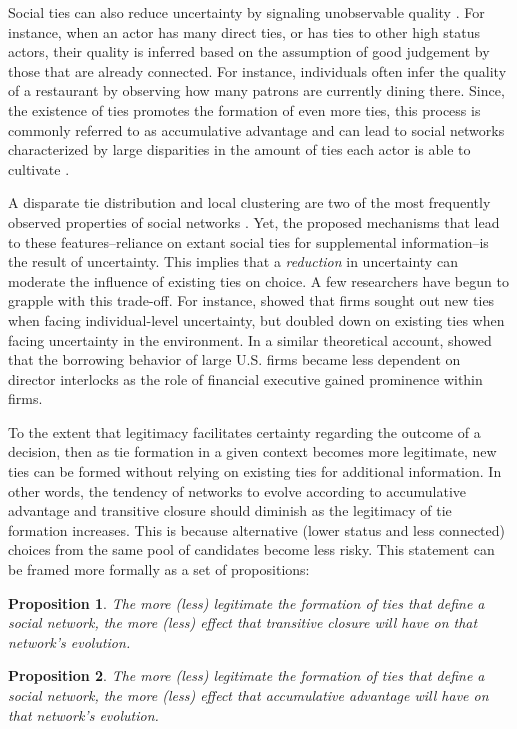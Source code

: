 \documentclass[12pt]{article}
\newtheorem{prop}{Proposition}
\begin{document}
Social ties can also reduce uncertainty by signaling unobservable quality \cite{514}. For instance, when an actor has many direct ties, or has ties to other high status actors, their quality is inferred based on the assumption of good judgement by those that are already connected. For instance, individuals often infer the quality of a restaurant by observing how many patrons are currently dining there. Since, the existence of ties promotes the formation of even more ties, this process is commonly referred to as accumulative advantage and can lead to social networks characterized by large disparities in the amount of ties each actor is able to cultivate \cite{538}. 

A disparate tie distribution and local clustering are two of the most frequently observed properties of social networks \cite{907}. Yet, the proposed mechanisms that lead to these features--reliance on extant social ties for supplemental information--is the result of uncertainty. This implies that a \emph{reduction} in uncertainty can moderate the influence of existing ties on choice. A few researchers have begun to grapple with this trade-off. For instance,  showed that firms sought out new ties when facing individual-level uncertainty, but doubled down on existing ties when facing uncertainty in the environment. In a similar theoretical account,  showed that the borrowing behavior of large U.S. firms became less dependent on director interlocks as the role of financial executive gained prominence within firms. 

To the extent that legitimacy facilitates certainty regarding the outcome of a decision, then as tie formation in a given context becomes more legitimate, new ties can be formed without relying on existing ties for additional information. In other words, the tendency of networks to evolve according to accumulative advantage and transitive closure should diminish as the legitimacy of tie formation increases. This is because alternative (lower status and less connected) choices from the same pool of candidates become less risky. This statement can be framed more formally as a set of propositions:

\begin{prop}
\begin{minipage}[t]{4.5 in}
The more (less) legitimate the formation of ties that define a social network, the more (less) effect that transitive closure will have on that network's evolution.
\end{minipage}
\end{prop}

\begin{prop}
\begin{minipage}[t]{4.5 in}
The more (less) legitimate the formation of ties that define a social network, the more (less) effect that accumulative advantage will have on that network's evolution.
\end{minipage}
\end{prop}


\clearpage



\end{document}
